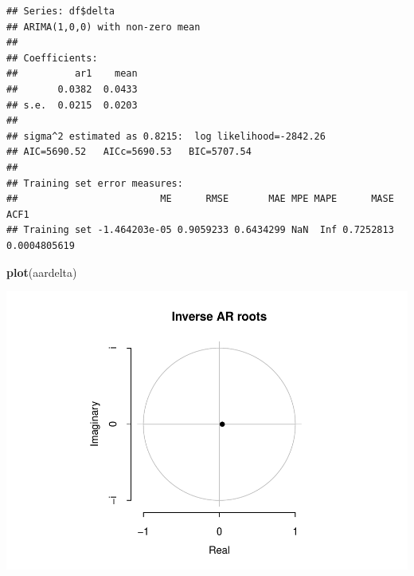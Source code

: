 \documentclass[11pt, a4paper]{report}
\newenvironment{Shaded}{\begin{snugshade}}{\end{snugshade}}
\newcommand{\KeywordTok}[1]{\textcolor[rgb]{0.13,0.29,0.53}{\textbf{#1}}}
\newcommand{\NormalTok}[1]{#1}
\newcommand{\OperatorTok}[1]{\textcolor[rgb]{0.81,0.36,0.00}{\textbf{#1}}}
\theoremstyle{plain}
\theoremstyle{plain}
\theoremstyle{remark}
\begin{document}
\begin{verbatim}
## Series: df$delta 
## ARIMA(1,0,0) with non-zero mean 
## 
## Coefficients:
##          ar1    mean
##       0.0382  0.0433
## s.e.  0.0215  0.0203
## 
## sigma^2 estimated as 0.8215:  log likelihood=-2842.26
## AIC=5690.52   AICc=5690.53   BIC=5707.54
## 
## Training set error measures:
##                         ME      RMSE       MAE MPE MAPE      MASE         ACF1
## Training set -1.464203e-05 0.9059233 0.6434299 NaN  Inf 0.7252813 0.0004805619
\end{verbatim}

\begin{Shaded}
\begin{Highlighting}[]
\KeywordTok{plot}\NormalTok{(aardelta)}
\end{Highlighting}
\end{Shaded}

\begin{center}\includegraphics{Econo2_P1_files/figure-latex/auto arima-7} \end{center}

\begin{Shaded}
\end{Shaded}
\end{document}
